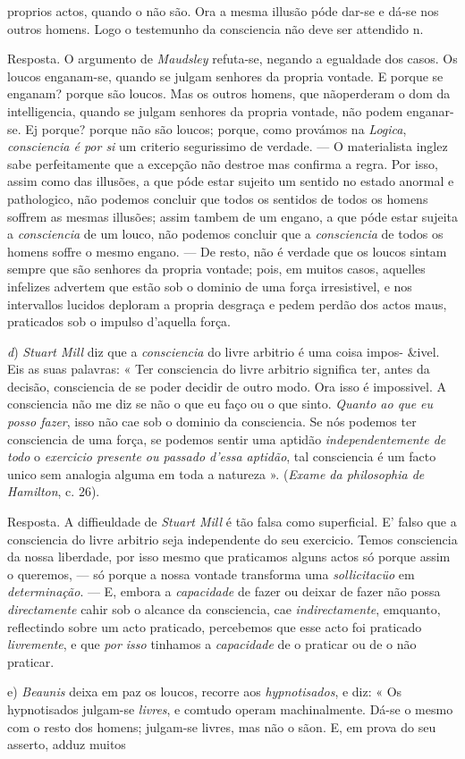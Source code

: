 proprios actos, quando o não são. Ora a mesma illusão póde dar-se e dá-se nos outros homens. Logo o testemunho da consciencia não deve ser attendido n.\par Resposta. O argumento de \emph{Maudsley} refuta-se, negando a egualdade dos casos. Os loucos enganam-se, quando se julgam senhores da propria vontade. E porque se enganam? porque são loucos. Mas os outros homens, que nãoperderam o dom da intelligencia, quando se julgam senhores da propria vontade, não podem enganar-se. Ej porque? porque não são loucos; porque, como provámos na \emph{Logica}, \emph{consciencia é por si} um criterio segurissimo de verdade. --- O materialista inglez sabe perfeitamente que a excepção não destroe mas confirma a regra. Por isso, assim como das illusões, a que póde estar sujeito um sentido no estado anormal e pathologico, não podemos concluir que todos os sentidos de todos os homens soffrem as mesmas illusões; assim tambem de um engano, a que póde estar sujeita a \emph{consciencia} de um louco, não podemos concluir que a \emph{consciencia} de todos os homens soffre o mesmo engano. --- De resto, não é verdade que os loucos sintam sempre que são senhores da propria vontade; pois, em muitos casos, aquelles infelizes advertem que estão sob o dominio de uma força irresistivel, e nos intervallos lucidos deploram a propria desgraça e pedem perdão dos actos maus, praticados sob o impulso d'aquella força.\par \emph{d}) \emph{Stuart Mill} diz que a \emph{consciencia} do livre arbitrio é uma coisa impos- \&ivel. Eis as suas palavras: « Ter consciencia do livre arbitrio significa ter, antes da decisão, consciencia de se poder decidir de outro modo. Ora isso é impossivel. A consciencia não me diz se não o que eu faço ou o que sinto. \emph{Quanto ao que eu posso fazer}, isso não cae sob o dominio da consciencia. Se nós podemos ter consciencia de uma força, se podemos sentir uma aptidão \emph{independentemente de todo} o \emph{exercicio presente ou passado d'essa aptidão}, tal consciencia é um facto unico sem analogia alguma em toda a natureza ». (\emph{Exame da philosophia de Hamilton}, c. 26).\par Resposta. A diffieuldade de \emph{Stuart Mill} é tão falsa como superficial. E' falso que a consciencia do livre arbitrio seja independente do seu exercicio. Temos consciencia da nossa liberdade, por isso mesmo que praticamos alguns actos só porque assim o queremos, --- só porque a nossa vontade transforma uma \emph{sollicitacüo} em \emph{determinação}. --- E, embora a \emph{capacidade} de fazer ou deixar de fazer não possa \emph{directamente} cahir sob o alcance da consciencia, cae \emph{indirectamente}, emquanto, reflectindo sobre um acto praticado, percebemos que esse acto foi praticado \emph{livremente}, e que \emph{por isso} tinhamos a \emph{capacidade} de o praticar ou de o não praticar.\par e) \emph{Beaunis} deixa em paz os loucos, recorre aos \emph{hypnotisados}, e diz: « Os hypnotisados julgam-se \emph{livres}, e comtudo operam machinalmente. Dá-se o mesmo com o resto dos homens; julgam-se livres, mas não o sãon. E, em prova do seu asserto, adduz muitos 